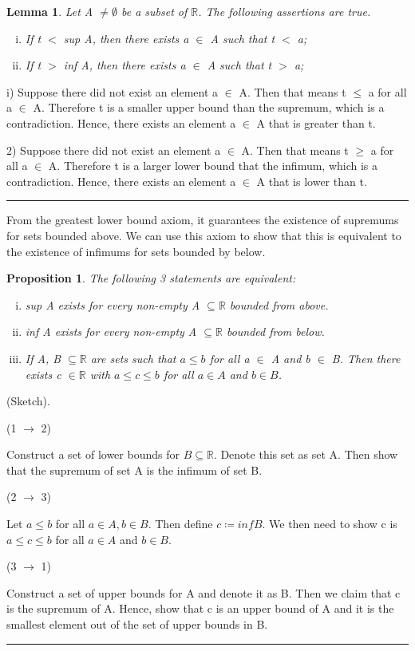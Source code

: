 \documentclass[twoside]{article}
\newtheorem{lemma}[theorem]{Lemma}
\newtheorem{proposition}[theorem]{Proposition}
\newenvironment{proof}{{\bf Proof:}}{\hfill\rule{2mm}{2mm}}
\begin{document}
\begin{lemma}
Let A $\neq \emptyset$ be a subset of $\mathbb{R}$. The following assertions are true.
\begin{enumerate}[(i)]
  \item If t $<$ sup A, then there exists a $\in$ A such that t $<$ a;
  \item If t $>$ inf A, then there exists a $\in$ A such that t $>$ a;
\end{enumerate}
\end{lemma}

\begin{proof}
i) Suppose there did not exist an element a $\in$ A. Then that means t $\leq$ a for all a $\in$ A. Therefore t is a smaller upper bound than the supremum, which is a contradiction. Hence, there exists an element a $\in$ A that is greater than t.

2) Suppose there did not exist an element a $\in$ A. Then that means t $\geq$ a for all a $\in$ A. Therefore t is a larger lower bound that the infimum, which is a contradiction. Hence, there exists an element a $\in$ A that is lower than t.
\end{proof}

From the greatest lower bound axiom, it guarantees the existence of supremums for sets bounded above. We can use this axiom to show that this is equivalent to the existence of infimums for sets bounded by below.

\begin{proposition}
The following 3 statements are equivalent:
\begin{enumerate}[(i)]
  \item sup A exists for every non-empty A $\subseteq \mathbb{R}$ bounded from above.
  \item inf A exists for every non-empty A $\subseteq \mathbb{R}$ bounded from below.
  \item If A, B $\subseteq \mathbb{R}$ are sets such that $a \leq b$ for all a $\in$ A and b $\in$ B. Then there exists c $\in \mathbb{R}$ with $a \leq c \leq b$ for all $a \in A$ and $b \in B$. 
\end{enumerate}
\end{proposition}

\begin{proof}(Sketch).

(1 $\rightarrow$ 2)

Construct a set of lower bounds for $B \subseteq \mathbb{R}$. Denote this set as set A. Then show that the supremum of set A is the infimum of set B.

(2 $\rightarrow$ 3)

Let $a \leq b$ for all $a \in A, b \in B$. Then define $c \coloneqq infB$. We then need to show c is $a \leq c \leq b$ for all $a \in A$ and $b \in B$.

(3 $\rightarrow$ 1)

Construct a set of upper bounds for A and denote it as B. Then we claim that c is the supremum of A. Hence, show that c is an upper bound of A and it is the smallest element out of the set of upper bounds in B.
\end{proof}
\end{document}

